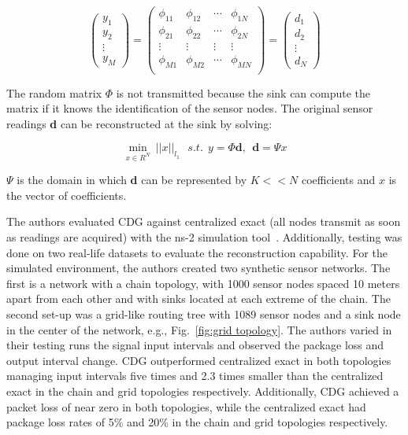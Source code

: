 $$
\begin{pmatrix}
    y_1 \\
    y_2 \\
    \vdots \\
    y_M
\end{pmatrix}
=
\begin{pmatrix}
    \phi_{11} & \phi_{12} & \dotsb & \phi_{1N}\\
    \phi_{21} & \phi_{22} & \dotsb & \phi_{2N}\\
    \vdots & \vdots & \vdots & \vdots\\
    \phi_{M1} & \phi_{M2} & \dotsb & \phi_{MN}\\
\end{pmatrix}
=
\begin{pmatrix}
    d_1 \\
    d_2 \\
    \vdots \\
    d_N
\end{pmatrix}
$$

The random matrix $ \Phi $ is not transmitted because the sink can compute the
matrix if it knows the identification of the sensor nodes. The original sensor
readings \textbf{d} can be reconstructed at the sink by solving:

$$
\displaystyle{\min_{x\in R^N} \ ||x||_{l_1}}  \ \ \   s.t.  \ \  y = \Phi \textbf{d} , \ \ 
\textbf{d}  = \Psi x
$$

$ \Psi $ is the domain in which \textbf{d} can be represented by $ K << N
$ coefficients and $ x $ is the vector of coefficients.

The authors evaluated \ac{CDG} against centralized exact (all nodes transmit as
soon as readings are acquired) with the ns-2 simulation
tool~\cite{bajaj1999improving}. Additionally, testing was done on two real-life
datasets to evaluate the reconstruction capability. For the simulated
environment, the authors created two synthetic sensor networks. The first is a
network with a chain topology, with 1000 sensor nodes spaced 10 meters apart
from each other and with sinks located at each extreme of the chain. The second
set-up was a grid-like routing tree with 1089 sensor nodes and a sink node in
the center of the network, e.g., Fig.~\ref{fig:grid topology}. The authors
varied in their testing runs the signal input intervals and observed the
package loss and output interval change. \ac{CDG} outperformed centralized
exact in both topologies managing input intervals five times and 2.3 times
smaller than the centralized exact in the chain and grid topologies
respectively. Additionally, \ac{CDG} achieved a packet loss of near zero in
both topologies, while the centralized exact had package loss rates of 5\% and
20\% in the chain and grid topologies respectively.


